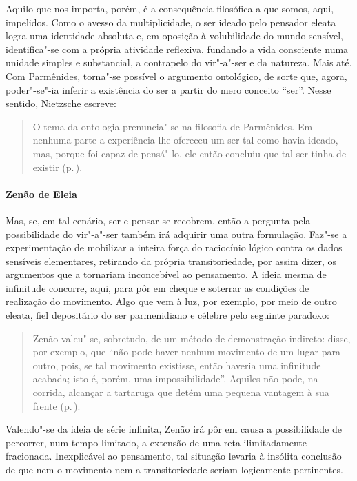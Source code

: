 Aquilo que nos importa, porém, é a consequência filosófica a que somos, aqui,
impelidos. Como o avesso da multiplicidade, o ser ideado pelo pensador eleata
logra uma identidade absoluta e, em oposição à volubilidade do mundo
sensível, identifica"-se com a própria atividade reflexiva, fundando a vida
consciente numa unidade simples e substancial, a contrapelo do vir"-a"-ser e
da natureza. Mais até. Com Parmênides, torna"-se possível o argumento
ontológico, de sorte que, agora, poder"-se"-ia inferir a existência do ser a
partir do mero conceito ``ser''. Nesse sentido, Nietzsche escreve: 

\begin{quote} 
O tema da ontologia prenuncia"-se na filosofia de
 Parmênides. Em nenhuma parte a experiência lhe ofereceu um ser tal como
 havia ideado, mas, porque foi capaz de pensá"-lo, ele então concluiu que tal
 ser tinha de existir (p.\,\pageref{temadaontologia}).
\end{quote} 

\paragraph{Zenão de Eleia} Mas, se, em tal cenário, ser e pensar se recobrem,
 então a pergunta pela possibilidade do vir"-a"-ser também irá adquirir uma
 outra formulação. Faz"-se a experimentação de mobilizar a inteira força do
 raciocínio lógico contra os dados sensíveis elementares, retirando da
 própria transitoriedade, por assim dizer, os argumentos que a tornariam
 inconcebível ao pensamento. A ideia mesma de infinitude concorre, aqui, para
 pôr em cheque e soterrar as condições de realização do movimento. Algo que
 vem à luz, por exemplo, por meio de outro eleata, fiel depositário do ser
 parmenidiano e célebre pelo seguinte paradoxo:

\begin{quote} 
Zenão valeu"-se, sobretudo, de um método de demonstração
 indireto: disse, por exemplo, que ``não pode haver nenhum movimento de um
 lugar para outro, pois, se tal movimento existisse, então haveria uma
 infinitude acabada; isto é, porém, uma impossibilidade''. Aquiles não pode,
 na corrida, alcançar a tartaruga que detém uma pequena vantagem à sua
 frente (p.\,\pageref{zenaovaleuse}).
\end{quote} 

Valendo"-se da ideia de série infinita, Zenão irá pôr em causa a possibilidade
de percorrer, num tempo limitado, a extensão de uma reta ilimitadamente
fracionada. Inexplicável ao pensamento, tal situação levaria à insólita
conclusão de que nem o movimento nem a transitoriedade seriam logicamente
pertinentes.

